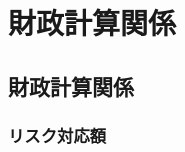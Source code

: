 \section{財政計算関係}

\subsection{財政計算関係}

\subsubsection{リスク対応額}


\begin{itembox}[l]{}
  
\end{itembox}

\begin{sol}
  \;

\end{sol}

\newpage

